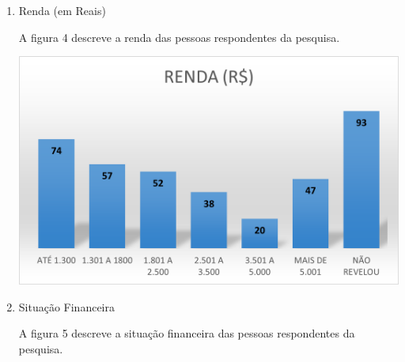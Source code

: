 \begin{enumerate}
    \item Renda (em Reais)

    A figura 4 descreve a renda das pessoas respondentes da pesquisa.

    \vspace{\baselineskip}
    \begin{center}
        \begin{minipage}{\textwidth}
            \includegraphics{figs/graph_renda.png}
            \label{fig:graph_renda}
        \end{minipage}        
    \end{center}

    \vspace{\baselineskip}
    \vspace{\baselineskip}
    \vspace{\baselineskip}
    \vspace{\baselineskip}
    \vspace{\baselineskip}
    \item Situação Financeira

    A figura 5 descreve a situação financeira das pessoas respondentes da pesquisa.


\end{enumerate}
